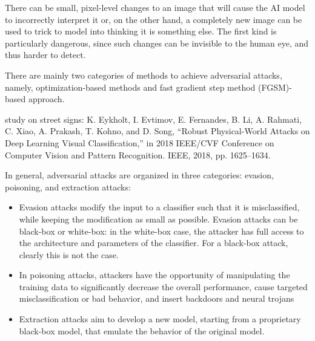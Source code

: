 There can be small, pixel-level changes to an image that will cause the AI model to incorrectly interpret it or, on the other hand, a completely new image can be used to trick to model into thinking it is something else. The first kind is particularly dangerous, since such changes can be invisible to the human eye, and thus harder to detect.

There are mainly two categories of methods to achieve adversarial attacks, namely, optimization-based methods and fast gradient step method (FGSM)-based approach.


study on street signs: K. Eykholt, I. Evtimov, E. Fernandes, B. Li, A. Rahmati, C. Xiao,
A. Prakash, T. Kohno, and D. Song, “Robust Physical-World Attacks on
Deep Learning Visual Classification,” in 2018 IEEE/CVF Conference on
Computer Vision and Pattern Recognition. IEEE, 2018, pp. 1625–1634.


In general, adversarial attacks are organized in three categories: evasion, poisoning, and extraction attacks:
\begin{itemize}
    \item Evasion attacks modify the input to a classifier such that it is misclassified, while keeping the modification as small as possible. Evasion attacks can be black-box or white-box: in the white-box case, the attacker has full access to the architecture and parameters of the classifier. For a black-box attack, clearly this is not the case.
    \item In poisoning attacks, attackers have the opportunity of manipulating the training data to significantly decrease the overall performance, cause targeted misclassification or bad behavior, and insert backdoors and neural trojans
    \item Extraction attacks aim to develop a new model, starting from a proprietary black-box model, that emulate the behavior of the original model.
\end{itemize}

